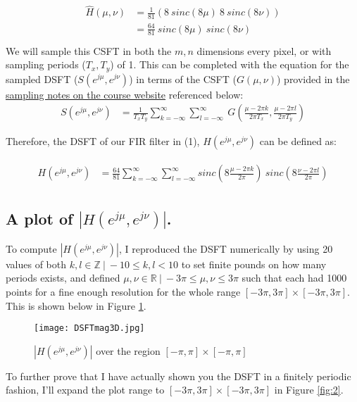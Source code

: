 \documentclass{article}
\begin{document}
\begin{align*}
    \begin{split}
    \hat{H}(\mu, \nu) &= \frac{1}{81}( 8 \ sinc(8 \mu) \  8 \ sinc(8 \nu) )\\
    &= \frac{64}{81}  \ sinc(8 \mu) \ sinc(8 \nu) \\
    \end{split}
\end{align*}
We will sample this CSFT in both the $m, n$ dimensions every pixel, or with sampling periods ($T_x, T_y$) of 1. This can be completed with the equation for the sampled DSFT ($S(e^{j \mu}, e^{j \nu})$) in terms of the CSFT ($G(\mu, \nu)$) provided in the \href{https://engineering.purdue.edu/~bouman/ece637/notes/pdf/Sampling.pdf}{sampling notes on the course website} referenced below:
\begin{align}\label{eq:5}
    S(e^{j \mu}, e^{j \nu}) &= \frac{1}{T_x T_y} \sum_{k=-\infty}^{\infty} \sum_{l=-\infty}^{\infty} \ G(\frac{\mu-2 \pi k}{2 \pi T_x}, \frac{\mu-2 \pi l}{2 \pi T_y})
\end{align}

Therefore, the DSFT of our FIR filter in (1), $H(e^{j \mu}, e^{j \nu})$ can be defined as:
\begin{tcolorbox}[colback=red!5!white,colframe=red!75!black]
\begin{align}\label{eq:6}
    \begin{split}
        H(e^{j \mu}, e^{j \nu}) &= \frac{64}{81}\sum_{k=-\infty}^{\infty} \sum_{l=-\infty}^{\infty} sinc(8 \frac{\mu - 2 \pi k}{2 \pi}) \ sinc(8 \frac{\nu - 2 \pi l}{2 \pi})
    \end{split}
\end{align}
\end{tcolorbox}
\newpage

\subsection{A plot of $|H(e^{j \mu}, e^{j \nu})|$.}
To compute $|H(e^{j \mu}, e^{j \nu})|$, I reproduced the DSFT numerically by using 20 values of both $k, l \in \mathbb{Z} \ | \  -10 \leq k,l < 10$ to set finite pounds on how many periods exists, and defined $\mu, \nu \in \mathbb{R} \ | \ -3\pi\leq \mu, \nu \leq 3\pi$ such that each had 1000 points for a fine enough resolution for the whole range $[-3\pi, 3\pi] \times [-3\pi, 3\pi]$. This is shown below in Figure \ref{fig:1}.

\begin{figure}[h]
    \centering
    \texttt{[image: DSFTmag3D.jpg]}
    \caption{$|H(e^{j \mu}, e^{j \nu})|$ over the region $[-\pi,\pi] \times [-\pi,\pi]$}
    \label{fig:1}
\end{figure}
\newpage
To further prove that I have actually shown you the DSFT in a finitely periodic fashion, I'll expand the plot range to $[-3\pi, 3\pi] \times [-3\pi, 3\pi]$ in Figure \ref{fig:2}.
\end{document}
